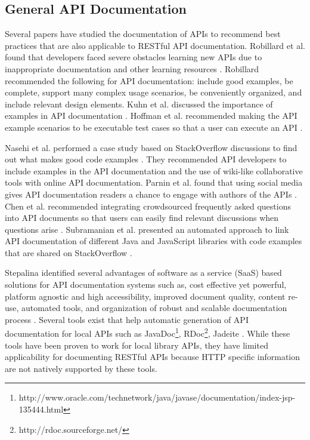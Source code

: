 \subsection{General API Documentation} %
\label{ssub:api_learnability}
Several papers have studied the documentation of APIs to recommend best practices that are also applicable to RESTful API documentation. Robillard et al. found that  developers faced severe obstacles learning new APIs due to inappropriate documentation and other learning resources \cite{Robillard_what_makes, Robillard_a_field_study}. Robillard recommended the following for API documentation: include good examples, be complete, support many complex usage scenarios, be conveniently organized, and include relevant design elements. Kuhn et al. discussed the importance of examples in API documentation \cite{Kuhn_on_designing}. Hoffman et al. recommended making the API example scenarios to be executable test cases so that a user can execute an API \cite{Hoffman_api_documentation}.

Nasehi et al. performed a case study based on StackOverflow discussions to find out what makes good code examples \cite{Nasehi_what_makes}. They recommended API developers to include examples in the API documentation and the use of wiki-like collaborative tools with online API documentation. Parnin et al. found that using social media gives API documentation readers a chance to engage with authors of the APIs \cite{Parnin_measuring}. Chen et al. recommended integrating crowdsourced frequently asked questions into API documents so that users can easily find relevant discussions when questions arise \cite{Chen_who_asked}. Subramanian et al. presented an automated approach to link API documentation of different Java and JavaScript libraries with code examples that are shared on StackOverflow \cite{Subramanian_live}.

Stepalina identified several advantages of software as a service (SaaS) based solutions for API documentation systems such as, cost effective yet powerful, platform agnostic and high accessibility, improved document quality, content re-use, automated tools, and organization of robust and scalable documentation process \cite{Stepalina_saas}. Several tools exist that help automatic generation of API documentation for local APIs such as JavaDoc\footnote{http://www.oracle.com/technetwork/java/javase/documentation/index-jsp-135444.html}, RDoc\footnote{http://rdoc.sourceforge.net/}, Jadeite \cite{Jadeite}. While these tools have been proven to work for local library APIs, they have limited applicability for documenting RESTful APIs because HTTP specific information are not natively supported by these tools.


